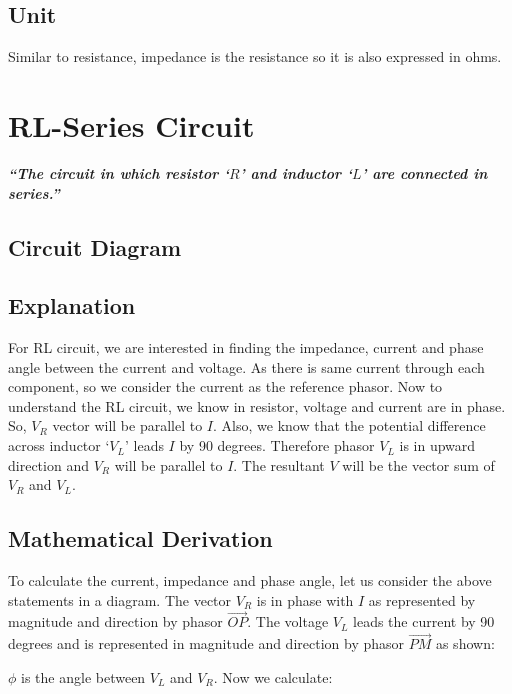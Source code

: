 \subsection*{Unit}
Similar to resistance, impedance is the resistance so it is also expressed
in ohms.
\section{RL-Series Circuit}
\textit{\textbf{“The circuit in which resistor ‘$R$’ and inductor
‘$L$’ are connected in series.”}}
\subsection*{Circuit Diagram}
\subsection*{Explanation}
For RL circuit, we are interested in finding the impedance, current and
phase angle between the current and voltage. As there is same current
through each component, so we consider the current as the reference phasor.
Now to understand the RL circuit, we know in resistor, voltage and current
are in phase. So, $V_{R}$ vector will be parallel to $I$. Also, we know
that the potential difference across inductor ‘$V_{L}$’ leads $I$ by 90
degrees. Therefore phasor $V_{L}$ is in upward direction
and $V_{R}$ will be parallel to $I$. The resultant $V$ will be the
vector sum of $V_{R}$ and $V_{L}$.

\subsection*{Mathematical Derivation}
To calculate the current, impedance and phase angle, let us consider the
above statements in a diagram. The vector $V_{R}$ is in
phase with $I$ as represented by magnitude and direction by phasor
$\vec{OP}$. The voltage $V_{L}$ leads the current by 90 degrees and is
represented in magnitude and direction by phasor $\vec{PM}$ as shown:

$\phi$ is the angle between $V_{L}$ and $V_{R}$. Now we calculate:

